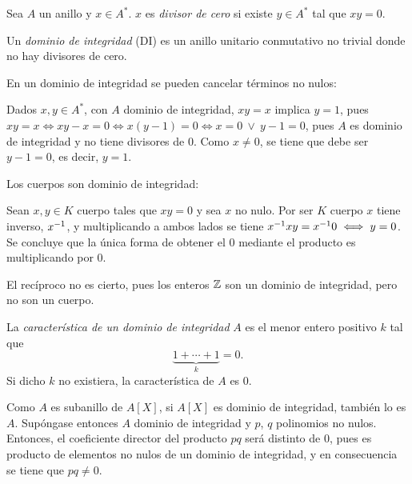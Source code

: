 \begin{deff}{\cite[p.~23]{GamboaAnillos}}
    Sea $A$ un anillo y $x\in A^*$. $x$ es \textit{divisor de cero} si existe $y \in A^*$ tal que $xy = 0$.
\end{deff}



\begin{deff}{\cite[p.~23]{GamboaAnillos}}
    Un \textit{dominio de integridad} (DI) es un anillo unitario conmutativo no trivial donde no hay divisores de cero.
\end{deff}

\begin{obss}
    \item En un dominio de integridad se pueden cancelar términos no nulos:
    
    Dados $x,y\in A^*$, con $A$ dominio de integridad, $xy=x$ implica $y=1$, pues $xy =x \iff xy - x = 0 \iff x(y-1) = 0 \iff x = 0 \ \lor\ y-1 = 0$, pues $A$ es dominio de integridad y no tiene divisores de 0. Como $x\neq0$, se tiene que debe ser $y-1 = 0$, es decir, $y = 1$.

    \item Los cuerpos son dominio de integridad:

    Sean $x,y\in K$ cuerpo tales que $xy = 0$ y sea $x$ no nulo. Por ser $K$ cuerpo $x$ tiene inverso, $x^{-1}$, y multiplicando a ambos lados se tiene $x^{-1}xy = x^{-1}0 \iff y = 0$. Se concluye que la única forma de obtener el 0 mediante el producto es multiplicando por 0.
    
    El recíproco no es cierto, pues los enteros $\mathbb{Z}$ son un dominio de integridad, pero no son un cuerpo.
\end{obss}

\begin{deff}{\cite[p.~39]{GamboaAnillos}}\label{caracteristica}
    La \textit{característica de un dominio de integridad} $A$ es el menor entero positivo $k$ tal que \[\underbrace{1 +  \cdots + 1}_{k} = 0.\]
    Si dicho $k$ no existiera, la característica de $A$ es $0$.
\end{deff}

\begin{prop}
\end{prop}

\begin{dem}{\cite[p.~118]{GamboaAnillos}}
Como $A$ es subanillo de $A[X]$, si $A[X]$ es dominio de integridad, también lo es $A$. Supóngase entonces $A$ dominio de integridad y $p$, $q$ polinomios no nulos. Entonces, el coeficiente director del producto $pq$ será distinto de 0, pues es producto de elementos no nulos de un dominio de integridad, y en consecuencia se tiene que $pq \neq 0$. 
\end{dem}

